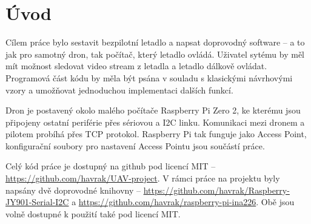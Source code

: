 \chapter*{Úvod}

Cílem práce bylo sestavit bezpilotní letadlo a napsat doprovodný software -- a to jak pro samotný dron, tak počítač, který letadlo ovládá.
Uživatel sytému by měl mít možnost sledovat video stream z letadla a letadlo dálkově ovládat.
Programová část kódu by měla být psána v souladu s klasickými návrhovými vzory a umožňovat jednoduchou implementaci dalších funkcí.

Dron je postavený okolo malého počítače Raspberry Pi Zero 2, ke kterému jsou připojeny ostatní periférie přes sériovou a I2C linku.
Komunikaci mezi dronem a pilotem probíhá přes TCP protokol.
Raspberry Pi tak funguje jako Access Point, konfigurační soubory pro nastavení Access Pointu jsou součástí práce.

Celý kód práce je dostupný na github pod licencí MIT -- \url{https://github.com/havrak/UAV-project}.
V rámci práce na projektu byly napsány dvě doprovodné knihovny -- \url{https://github.com/havrak/Raspberry-JY901-Serial-I2C} a \url{https://github.com/havrak/raspberry-pi-ina226}.
Obě jsou volně dostupné k použití také pod licencí MIT.

